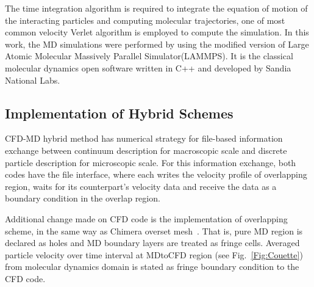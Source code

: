 \documentclass[conference,final]{IEEEtran}
\newcommand{\skonote}[1]{ {\textcolor{blue} { ***Jeff: #1 }}}
\newcommand{\skonote}[1]{}
\begin{document}
The time integration algorithm is required to integrate the equation of motion of the interacting particles and computing molecular trajectories, one of most common velocity Verlet algorithm is employed to compute the simulation.
In this work,  the MD simulations were performed by using the modified version of Large Atomic Molecular Massively Parallel Simulator(LAMMPS). It is the classical molecular dynamics open software written in C++ and developed by Sandia National Labs.~\cite{LAMMPS}


\subsection{Implementation of Hybrid Schemes}


CFD-MD hybrid method has numerical strategy for file-based information exchange between continuum description for macroscopic scale and discrete particle description for microscopic scale. For this information exchange, both codes have the file interface, where each writes the velocity profile of overlapping region, waits for its counterpart's velocity data and receive the data as a boundary condition in the overlap region.
\newline


Additional change made on CFD code is the implementation of overlapping scheme, in the same way as Chimera overset mesh~\cite{Chimera}. That is, pure MD region is declared as holes and MD boundary layers are treated as fringe cells. Averaged particle velocity over time interval at MDtoCFD region (see Fig.~\ref{Fig:Couette}) from molecular dynamics domain is stated as fringe boundary condition to the CFD code.
\end{document}
